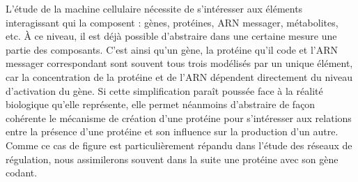 
L'étude de la machine cellulaire nécessite de s'intéresser aux éléments interagissant
qui la composent :
gènes, protéines, ARN messager, métabolites, etc.
% 
À ce niveau, il est déjà possible d'abstraire dans une certaine mesure
une partie des composants.
C'est ainsi qu'un gène, la protéine qu'il code et l'ARN messager correspondant sont
souvent tous trois modélisés par un unique élément,
car la concentration de la protéine et de l'ARN
dépendent directement du niveau d'activation du gène.
Si cette simplification paraît poussée face à la réalité biologique qu'elle représente,
elle permet néanmoins d'abstraire de façon cohérente le mécanisme de création d'une protéine
pour s'intéresser aux relations
entre la présence d'une protéine et son influence sur la production d'un autre.
Comme ce cas de figure est particulièrement répandu dans l'étude des réseaux de régulation,
nous assimilerons souvent dans la suite une protéine avec son gène codant.

